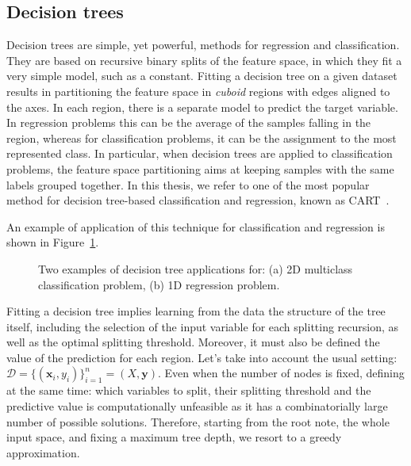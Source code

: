 		\subsection{Decision trees} \label{sec:decision_trees} 
		Decision trees are simple, yet powerful, methods for regression and classification.
		They are based on recursive binary splits of the feature space, in which they fit a very simple model, such as a constant.
		Fitting a decision tree on a given dataset results in partitioning the feature space in \textit{cuboid} regions with edges aligned to the axes.
		In each region, there is a separate model to predict the target variable. In regression problems this can be the average of the samples falling in the region, whereas for classification problems, it can be the assignment to the most represented class.
		In particular, when decision trees are applied to classification problems, the feature space partitioning aims at keeping samples with the same labels grouped together.
		In this thesis, we refer to one of the most popular method for decision tree-based classification and regression, known as \ac{CART}~\cite{breiman1984classification}.
		
		An example of application of this technique for classification and regression is shown in Figure~\ref{fig:decision_trees}.
		
		\begin{figure}[!ht]
			\centering
			\caption{Two examples of decision tree applications for: (a) 2D multiclass classification problem, (b) 1D regression problem.}\label{fig:decision_trees}
		\end{figure}
		
		Fitting a decision tree implies learning from the data the structure of the tree itself, including the selection of the input variable for each splitting recursion, as well as the optimal splitting threshold. Moreover, it must also be defined the value of the prediction for each region.
		Let's take into account the usual setting: $\mathcal{D} = \{(\bm{x}_i, y_i)\}_{i=1}^n = (X, \bm{y})$. Even when the number of nodes is fixed, defining at the same time: which variables to split, their splitting threshold and the predictive value is computationally unfeasible as it has a combinatorially large number of possible solutions. Therefore, starting from the root note, \ie the whole input space, and fixing a maximum tree depth, we resort to a greedy approximation.
		

